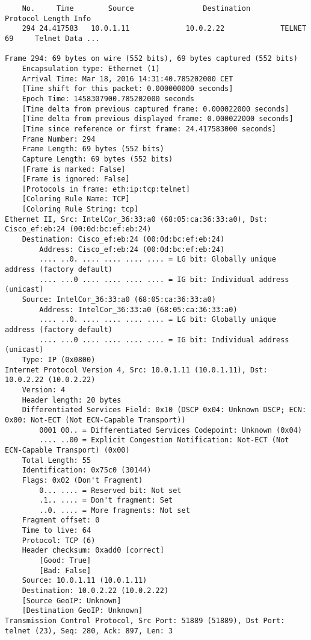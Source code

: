 \begin{lstlisting}
    No.     Time        Source                Destination           Protocol Length Info
    294 24.417583   10.0.1.11             10.0.2.22             TELNET   69     Telnet Data ...

Frame 294: 69 bytes on wire (552 bits), 69 bytes captured (552 bits)
    Encapsulation type: Ethernet (1)
    Arrival Time: Mar 18, 2016 14:31:40.785202000 CET
    [Time shift for this packet: 0.000000000 seconds]
    Epoch Time: 1458307900.785202000 seconds
    [Time delta from previous captured frame: 0.000022000 seconds]
    [Time delta from previous displayed frame: 0.000022000 seconds]
    [Time since reference or first frame: 24.417583000 seconds]
    Frame Number: 294
    Frame Length: 69 bytes (552 bits)
    Capture Length: 69 bytes (552 bits)
    [Frame is marked: False]
    [Frame is ignored: False]
    [Protocols in frame: eth:ip:tcp:telnet]
    [Coloring Rule Name: TCP]
    [Coloring Rule String: tcp]
Ethernet II, Src: IntelCor_36:33:a0 (68:05:ca:36:33:a0), Dst: Cisco_ef:eb:24 (00:0d:bc:ef:eb:24)
    Destination: Cisco_ef:eb:24 (00:0d:bc:ef:eb:24)
        Address: Cisco_ef:eb:24 (00:0d:bc:ef:eb:24)
        .... ..0. .... .... .... .... = LG bit: Globally unique address (factory default)
        .... ...0 .... .... .... .... = IG bit: Individual address (unicast)
    Source: IntelCor_36:33:a0 (68:05:ca:36:33:a0)
        Address: IntelCor_36:33:a0 (68:05:ca:36:33:a0)
        .... ..0. .... .... .... .... = LG bit: Globally unique address (factory default)
        .... ...0 .... .... .... .... = IG bit: Individual address (unicast)
    Type: IP (0x0800)
Internet Protocol Version 4, Src: 10.0.1.11 (10.0.1.11), Dst: 10.0.2.22 (10.0.2.22)
    Version: 4
    Header length: 20 bytes
    Differentiated Services Field: 0x10 (DSCP 0x04: Unknown DSCP; ECN: 0x00: Not-ECT (Not ECN-Capable Transport))
        0001 00.. = Differentiated Services Codepoint: Unknown (0x04)
        .... ..00 = Explicit Congestion Notification: Not-ECT (Not ECN-Capable Transport) (0x00)
    Total Length: 55
    Identification: 0x75c0 (30144)
    Flags: 0x02 (Don't Fragment)
        0... .... = Reserved bit: Not set
        .1.. .... = Don't fragment: Set
        ..0. .... = More fragments: Not set
    Fragment offset: 0
    Time to live: 64
    Protocol: TCP (6)
    Header checksum: 0xadd0 [correct]
        [Good: True]
        [Bad: False]
    Source: 10.0.1.11 (10.0.1.11)
    Destination: 10.0.2.22 (10.0.2.22)
    [Source GeoIP: Unknown]
    [Destination GeoIP: Unknown]
Transmission Control Protocol, Src Port: 51889 (51889), Dst Port: telnet (23), Seq: 280, Ack: 897, Len: 3

\end{lstlisting}
